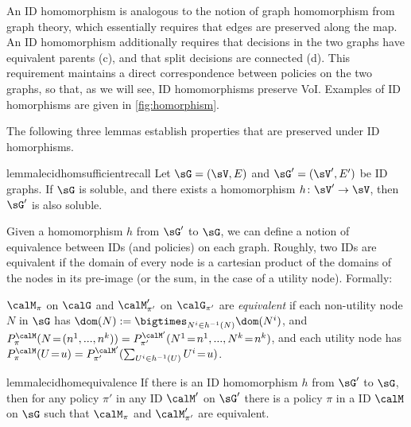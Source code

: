 An ID homomorphism is analogous to the notion of graph homomorphism from graph theory, which essentially requires that edges are preserved along the map. 
An ID homomorphism additionally
requires that decisions in the two graphs have equivalent parents (c), and that split decisions are connected (d). This requirement maintains a direct correspondence between policies on the two graphs, so that, as we will see, ID homomorphisms preserve VoI.
Examples of ID homorphisms are given in \cref{fig:homorphism}.
~


The following three lemmas establish properties that are preserved under
ID homorphisms. %
\begin{restatable}{lemma}{lecidhomsufficientrecall} \label{20nov25.1-CID-homomorphism-preserves-sufficient-recall-SR}
Let $\sG=(\sV,E)$ and $\sG'=(\sV',E')$ be ID graphs. If $\sG$ is soluble, and there exists a homomorphism $h\colon\sV'\to\sV$, then $\sG'$ is also soluble.
\end{restatable}



Given a homomorphism $h$ from $\sG'$ to $\sG$, we can define a notion of 
equivalence between IDs (and policies) on each graph.
Roughly, two IDs are equivalent if the domain of every node 
is a cartesian product of the domains of the nodes in its pre-image (or the 
sum, in the case of a utility node).
Formally:

\begin{definition}[Equivalence]
$\calM_\pi$ on $\calG$ and $\calM'_{\pi'}$ on $\calG_{\pi'}$ are \emph{equivalent} if
each non-utility node $N$ in $\sG$ has $\dom(N):=\bigtimes_{N^i \in h^{-1}(N)} \dom(N^i)$,
and $P^\calM_\pi(N\!=\!(n^1,...,n^k))=P^{\calM'}_{\pi'}(N^1\!=\!n^1,...,N^k\!=\!n^k)$, 
and each utility node has $P^\calM_\pi(U\!=\!u)=P^{\calM'}_{\pi'}(\sum_{U^i\in h^{-1}(U)} U^i\! =\! u)$.
\end{definition}

\begin{restatable}[Equivalence]{lemma}{lecidhomequivalence} \label{le:cidhom1-equivalence}
If there is an ID homomorphism $h$ from $\sG '$ to $\sG$,
then for any policy $\pi'$ in any ID $\calM'$ on $\sG '$ 
there is a policy $\pi$ in a ID $\calM$ on $\sG$ 
such that $\calM_\pi$ and $\calM'_{\pi'}$ are equivalent. 
\end{restatable}

